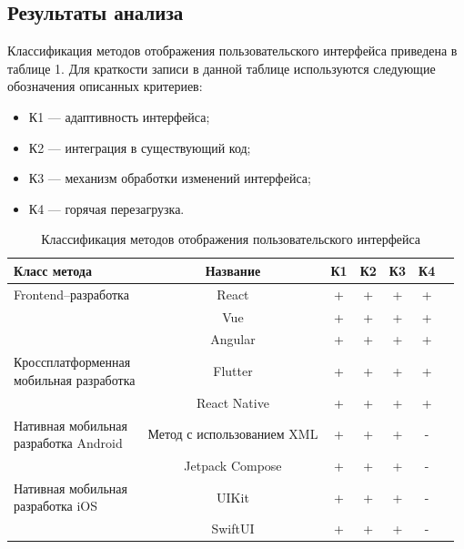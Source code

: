 \subsection{Результаты анализа} 

Классификация методов отображения пользовательского интерфейса приведена в таблице 1. %
Для краткости записи в данной таблице используются следующие обозначения описанных критериев:
 \begin{itemize}[label=---]
	\item К1 --- адаптивность интерфейса;
	\item К2 --- интеграция в существующий код;
	\item К3 --- механизм обработки изменений интерфейса;
	\item К4 --- горячая перезагрузка.
\end{itemize}

\begin{table}[!htb]
	\label{table1}
	\begin{center}
		\caption{Классификация методов отображения пользовательского интерфейса}
		\begin{tabular}{|p{5.5cm}|c|c|c|c|c|c|}
			\hline
			\textbf{Класс метода} & \textbf{Название} & 
			\textbf{К1} & \textbf{К2} & \textbf{К3} & \textbf{К4}\\
			\hline
			{Frontend--разработка} & 
			React & 
			+ & + & + & + \\
			\cline{2-6} & Vue & 
			+ & + & + & + \\
			\cline{2-6} &Angular & 
			+ & + & + & + \\
			\hline
			{Кроссплатформенная  \newline{} мобильная разработка} & 
			Flutter &  
			+ & + & + & + \\
			\cline{2-6} & React Native &  
			+ & + & + & + \\
			\hline
			{Нативная мобильная \newline{} разработка Android} & 
			Метод с использованием XML &  
			+ & + & + & - \\
			\cline{2-6} & Jetpack Compose &  
			+ & + & + & - \\
			\hline
			{Нативная мобильная \newline{} разработка iOS} & 
			UIKit &  
			+ & + & + & - \\
			\cline{2-6} & SwiftUI &  
			+ & + & + & - \\
			\hline
		\end{tabular}	
	\end{center}
\end{table}

